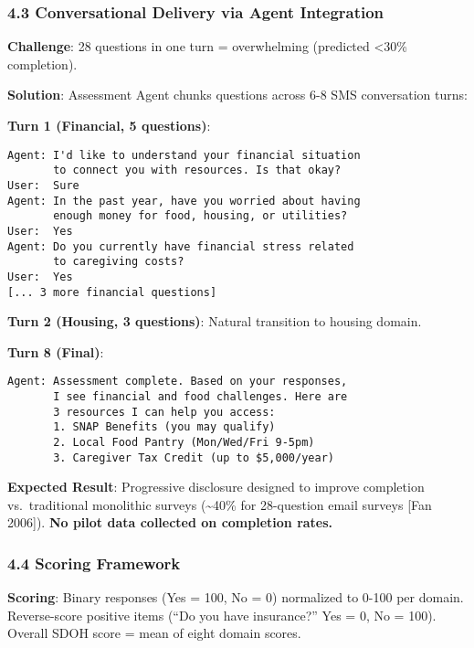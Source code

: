 \documentclass[
]{article}
\begin{document}
\subsubsection{4.3 Conversational Delivery via Agent
Integration}\label{conversational-delivery-via-agent-integration}

\textbf{Challenge}: 28 questions in one turn = overwhelming (predicted
\textless30\% completion).

\textbf{Solution}: Assessment Agent chunks questions across 6-8 SMS
conversation turns:

\textbf{Turn 1 (Financial, 5 questions)}:

\begin{verbatim}
Agent: I'd like to understand your financial situation
       to connect you with resources. Is that okay?
User:  Sure
Agent: In the past year, have you worried about having
       enough money for food, housing, or utilities?
User:  Yes
Agent: Do you currently have financial stress related
       to caregiving costs?
User:  Yes
[... 3 more financial questions]
\end{verbatim}

\textbf{Turn 2 (Housing, 3 questions)}: Natural transition to housing
domain.

\textbf{Turn 8 (Final)}:

\begin{verbatim}
Agent: Assessment complete. Based on your responses,
       I see financial and food challenges. Here are
       3 resources I can help you access:
       1. SNAP Benefits (you may qualify)
       2. Local Food Pantry (Mon/Wed/Fri 9-5pm)
       3. Caregiver Tax Credit (up to $5,000/year)
\end{verbatim}

\textbf{Expected Result}: Progressive disclosure designed to improve
completion vs.~traditional monolithic surveys (\textasciitilde40\% for
28-question email surveys {[}Fan 2006{]}). \textbf{No pilot data
collected on completion rates.}

\subsubsection{4.4 Scoring Framework}\label{scoring-framework}

\textbf{Scoring}: Binary responses (Yes = 100, No = 0) normalized to
0-100 per domain. Reverse-score positive items (``Do you have
insurance?'' Yes = 0, No = 100). Overall SDOH score = mean of eight
domain scores.
\end{document}
